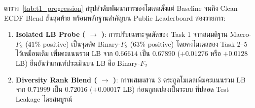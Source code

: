ตาราง~\ref{tab:t1_progression} สรุปลำดับพัฒนาการของโมเดลตั้งแต่ Baseline จนถึง Clean ECDF Blend ขั้นสุดท้าย พร้อมหลักฐานสำคัญบน Public Leaderboard สองรายการ:
\begin{enumerate}
  \item \textbf{Isolated LB Probe ( $\rightarrow$ )}: การปรับเฉพาะจุดตัดของ Task 1 จากสมมติฐาน Macro-$F_2$ ($41\%$ positive) เป็นจุดตัด Binary-$F_2$ ($63\%$ positive) โดยคงโมเดลของ Task 2--5 ไว้เหมือนเดิม เพิ่มคะแนนรวม LB จาก $0.66614$ เป็น $\mathbf{0.67890}$ ($\mathbf{+0.01276}$ หรือ $+0.0128$ LB) ยืนยันว่าเกณฑ์ประเมินบน LB คือ Binary-$F_2$
  \item \textbf{Diversity Rank Blend ( $\rightarrow$ )}: การผสมผสาน $3$ ตระกูลโมเดลเพิ่มคะแนนรวม LB จาก $0.71999$ เป็น $0.72016$ ($+0.00017$ LB) ก่อนถูกแปลงเป็นระบบ  ที่ปลอด Test Leakage โดยสมบูรณ์
\end{enumerate}

